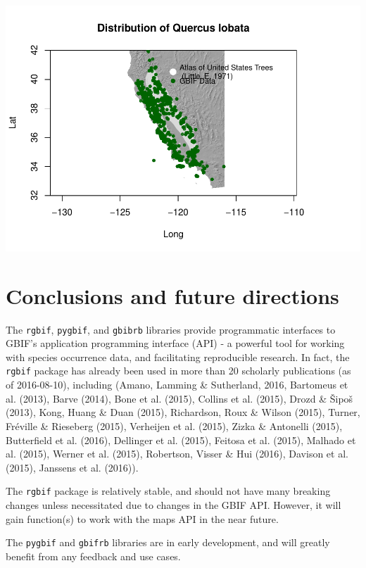 \documentclass[author-year, review, 11pt]{components/elsarticle} %
\makeatletter
\def\maxwidth{\ifdim\Gin@nat@width>\linewidth\linewidth
\else\Gin@nat@width\fi}
\let\Oldincludegraphics\includegraphics
\renewcommand{\includegraphics}[1]{\Oldincludegraphics[width=\maxwidth]{#1}}
\makeatother
\begin{document}
\includegraphics{components/figure/manuscript-unnamed-chunk-65-1.pdf}

\section{Conclusions and future
directions}\label{conclusions-and-future-directions}

The \texttt{rgbif}, \texttt{pygbif}, and \texttt{gbibrb} libraries
provide programmatic interfaces to GBIF's application programming
interface (API) - a powerful tool for working with species occurrence
data, and facilitating reproducible research. In fact, the
\texttt{rgbif} package has already been used in more than 20 scholarly
publications (as of 2016-08-10), including (Amano, Lamming \&
Sutherland, 2016, Bartomeus et al. (2013), Barve (2014), Bone et al.
(2015), Collins et al. (2015), Drozd \& Šipoš (2013), Kong, Huang \&
Duan (2015), Richardson, Roux \& Wilson (2015), Turner, Fréville \&
Rieseberg (2015), Verheijen et al. (2015), Zizka \& Antonelli (2015),
Butterfield et al. (2016), Dellinger et al. (2015), Feitosa et al.
(2015), Malhado et al. (2015), Werner et al. (2015), Robertson, Visser
\& Hui (2016), Davison et al. (2015), Janssens et al. (2016)).

The \texttt{rgbif} package is relatively stable, and should not have
many breaking changes unless necessitated due to changes in the GBIF
API. However, it will gain function(s) to work with the maps API in the
near future.

The \texttt{pygbif} and \texttt{gbifrb} libraries are in early
development, and will greatly benefit from any feedback and use cases.
\end{document}
